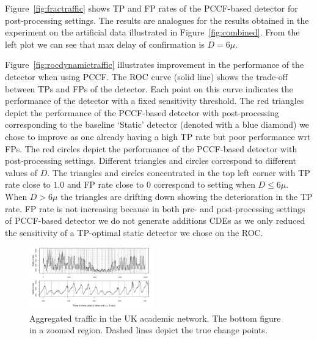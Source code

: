 Figure~\ref{fig:fractraffic} shows TP and FP rates of the PCCF-based detector for post-processing settings. The results are analogues for the results obtained in the experiment on the artificial data illustrated in Figure~\ref{fig:combined}. From the left plot we can see that max delay of confirmation is $D=6\mu$.

Figure~\ref{fig:rocdynamictraffic} illustrates improvement in the performance of the detector when using PCCF.
The ROC curve (solid line) shows the trade-off between TPs and FPs of the detector. %
Each point on this curve indicates the performance of the detector with a fixed sensitivity threshold.
The red triangles depict the performance of the PCCF-based detector with post-processing corresponding to the baseline `Static' detector (denoted with a blue diamond) we chose to improve as one already having a high TP rate but poor performance wrt FPs.
The red circles depict the performance of the PCCF-based detector with post-processing settings.
Different triangles and circles correspond to different values of $D$.
The triangles and circles concentrated in the top left corner with TP rate close to $1.0$ and FP rate close to $0$ correspond to setting when $D\leq6\mu$.
When $D>6\mu$ the triangles are drifting down showing the deterioration in the TP rate.
FP rate is not increasing because in both pre- and post-processing settings of PCCF-based detector we do not generate additions CDEs as we only reduced the sensitivity of a TP-optimal static detector we chose on the ROC.
\begin{figure}[htb!]
\centering
\includegraphics[width=0.48\textwidth]{articles/pics/sdm_paper/TrafficData.pdf}
\caption{
Aggregated traffic in the UK academic network.
The bottom figure in a zoomed region.
Dashed lines depict the true change points. %
}
\label{fig:trafficdata}
\end{figure}
%
